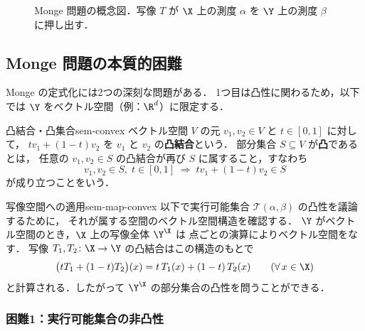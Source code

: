 \begin{figure}[htbp]
\caption{Monge 問題の概念図．写像 $T$ が $\X$ 上の測度 $\alpha$ を $\Y$ 上の測度 $\beta$ に押し出す．}
\label{fig:sem-monge}
\end{figure}

\subsection{Monge 問題の本質的困難}

Monge の定式化には2つの深刻な問題がある．
1つ目は凸性に関わるため，以下では $\Y$ をベクトル空間（例：$\R^d$）に限定する．

\begin{definition}{凸結合・凸集合}{sem-convex}
  ベクトル空間 $V$ の元 $v_1, v_2 \in V$ と $t \in [0,1]$ に対して，
  $t v_1 + (1-t) v_2$ を $v_1$ と $v_2$ の\textbf{凸結合}という．
  部分集合 $S \subseteq V$ が\textbf{凸}であるとは，
  任意の $v_1, v_2 \in S$ の凸結合が再び $S$ に属すること，すなわち
  \[
    v_1, v_2 \in S,\; t \in [0,1]
    \;\Longrightarrow\;
    t v_1 + (1-t) v_2 \in S
  \]
  が成り立つことをいう．
\end{definition}

\begin{remark}{写像空間への適用}{sem-map-convex}
  以下で実行可能集合 $\mathcal{T}(\alpha,\beta)$ の凸性を議論するために，
  それが属する空間のベクトル空間構造を確認する．
  $\Y$ がベクトル空間のとき，$\X$ 上の写像全体 $\Y^{\X}$ は
  点ごとの演算によりベクトル空間をなす．
  写像 $T_1, T_2 \colon \X \to \Y$ の凸結合はこの構造のもとで
  \[
    \bigl(t T_1 + (1-t)T_2\bigr)(x) = t\,T_1(x) + (1-t)\,T_2(x)
    \qquad (\forall\, x \in \X)
  \]
  と計算される．したがって $\Y^{\X}$ の部分集合の凸性を問うことができる．
\end{remark}

\subsubsection{困難1：実行可能集合の非凸性}

